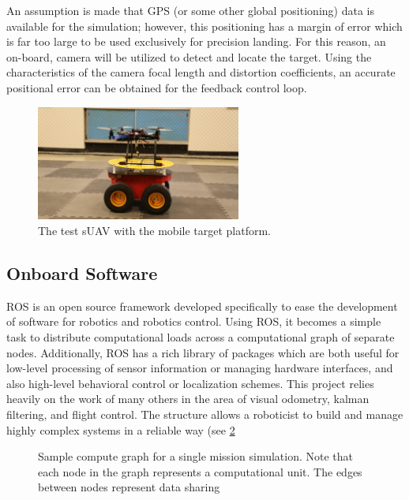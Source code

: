 An assumption is made that GPS (or some other global positioning) data is available for the simulation;
however, this positioning has a margin of error which is far too large to be used exclusively for precision
landing. For this reason, an on-board, camera will be utilized to detect and locate the target. Using
the characteristics of the camera focal length and distortion coefficients, an accurate positional error can
be obtained for the feedback control loop. 

\begin{figure}[ht]
    \centering
    \includegraphics[width=0.6\textwidth]{images/irols.jpg}
    \caption{The test sUAV with the mobile target platform.}\label{f:lezl-olli}
\end{figure}

\subsection{Onboard Software}
ROS is an open source framework developed specifically to ease the development of software for robotics and
robotics control\cite{quigley2009ros}. Using ROS, it becomes a simple task to distribute computational loads
across a computational graph of separate nodes. Additionally, ROS has a rich library of packages which are
both useful for low-level processing of sensor information or managing hardware interfaces, and also
high-level behavioral control or localization schemes. This project relies heavily on the work of many others
in the area of visual odometry\cite{olson2011tags}, kalman filtering\cite{MooreStouchKeneralizedEkf2014}, and
flight control\cite{rotors:2016,meier2015px4}. The structure allows a roboticist to build and manage highly
complex systems in a reliable way (see \cref{f:rosgraph}

\begin{figure}[ht]
    \centering
    \caption{Sample compute graph for a single mission simulation. Note that each node in the graph represents
    a computational unit. The edges between nodes represent data sharing}\label{f:rosgraph}
\end{figure}

